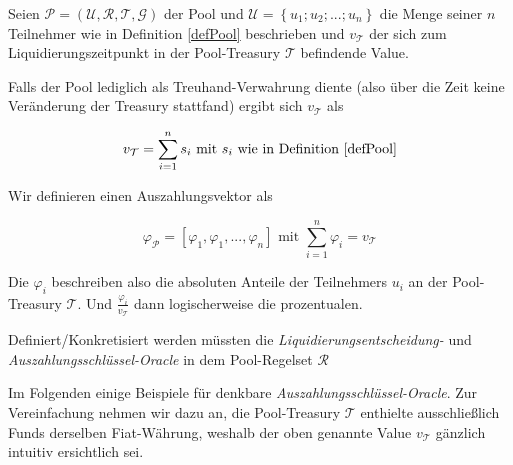 \begin{Fazit}

Seien $\mathcal{P} = \left( \mathcal{U}, \mathcal{R}, \mathcal{T}, \mathcal{G} \right)$ 
der Pool und $\mathcal{U} = \left\{ u_1; u_2;...;u_n \right\}$ die Menge seiner $n$ Teilnehmer wie in Definition \ref{defPool} beschrieben und $v_{\mathcal{T}}$ der sich zum Liquidierungszeitpunkt in der Pool-Treasury $\mathcal{T}$ befindende Value. 

Falls der Pool lediglich als Treuhand-Verwahrung diente (also über die Zeit keine Veränderung der Treasury stattfand) ergibt sich $v_{\mathcal{T}}$ als  

\vspace{0.1cm}

\begin{equation*}
  v_{\mathcal{T}} = \sum_{i=1}^{n} s_i \text{ mit } s_i \text{ wie in Definition \ref{defPool}}
\end{equation*}

\vspace{0.2cm}

Wir definieren einen Auszahlungsvektor als

\begin{equation*}
  \varphi_{\mathcal{P}} = [\varphi_1, \varphi_1, ..., \varphi_n] \text{ mit } \sum_{i=1}^{n} \varphi_i = v_{\mathcal{T}} 
\end{equation*}

\vspace{0.2cm}

Die $\varphi_i$ beschreiben also die absoluten Anteile der Teilnehmers $u_i$ an der Pool-Treasury $\mathcal{T}$. Und $\frac{\varphi_i}{v_{\mathcal{T}}}$ dann logischerweise die prozentualen.

\end{Fazit}


Definiert/Konkretisiert werden müssten die \textit{Liquidierungsentscheidung-} und \textit{Auszahl\-ungsschlüssel-Oracle} in dem Pool-Regelset $\mathcal{R}$

\vspace{0.3cm}

Im Folgenden einige Beispiele für denkbare \textit{Auszahlungsschlüssel-Oracle}. Zur Vereinfachung nehmen wir dazu an, die Pool-Treasury $\mathcal{T}$ enthielte ausschließlich Funds derselben Fiat-Währung, weshalb
der oben genannte Value $v_{\mathcal{T}}$ gänzlich intuitiv ersichtlich sei.  


\vspace{0.3cm}

